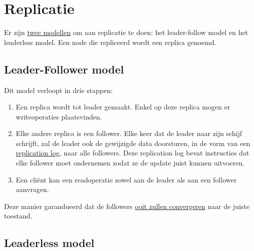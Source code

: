 \documentclass{report}
\begin{document}
	\section{Replicatie}
	\label{sec:replicatie}
	Er zijn \underline{twee modellen} om aan replicatie te doen: het leader-follow model en het leaderless model. Een node die repliceerd wordt een replica genoemd.
	\subsection{Leader-Follower model}
	Dit model verloopt in drie stappen:
	\begin{enumerate}
		\item Een replica wordt tot leader gemaakt. Enkel op deze replica mogen er writeoperaties plaatsvinden.
		\item Elke andere replica is een follower. Elke keer dat de leader naar zijn schijf schrijft, zal de leader ook de gewijzigde data doorsturen, in de vorm van een \underline{replication log}, naar alle followers. Deze replication log bevat instructies dat elke follower moet ondernemen zodat ze de update juist kunnen uitvoeren.
		\item Een cliënt kan een readoperatie zowel aan de leader als aan een follower aanvragen. 
	\end{enumerate}
	Deze manier garandueerd dat de followers \underline{ooit zullen convergeren} naar de juiste toestand.
	\subsection{Leaderless model}
\end{document}
